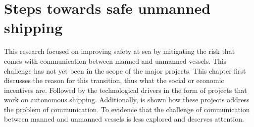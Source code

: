 \chapter{Steps towards safe unmanned shipping}
\label{ch:future}
This research focused on improving safety at sea by mitigating the risk that comes with communication between manned and unmanned vessels. This challenge has not yet been in the scope of the major projects. This chapter first discusses the reason for this transition, thus what the social or economic incentives are. Followed by the technological drivers in the form of projects that work on autonomous shipping. Additionally, is shown how these projects address the problem of communication. To evidence that the challenge of communication between manned and unmanned vessels is less explored and deserves attention.


